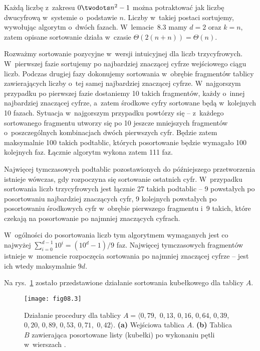 \exercise %
Każdą liczbę z~zakresu $0\twodots n^2-1$ można potraktować jak liczbę dwucyfrową w~systemie o~podstawie $n$. Liczby w~takiej postaci sortujemy, wywołując algorytm  o~dwóch fazach. W~lemacie~8.3 mamy $d=2$ oraz $k=n$, zatem opisane sortowanie działa w~czasie $\Theta(2(n+n))=\Theta(n)$.

\exercise %
Rozważmy sortowanie pozycyjne w~wersji intuicyjnej dla liczb trzycyfrowych. W~pierwszej fazie sortujemy po najbardziej znaczącej cyfrze wejściowego ciągu liczb. Podczas drugiej fazy dokonujemy sortowania w~obrębie fragmentów tablicy zawierających liczby o~tej samej najbardziej znaczącej cyfrze. W~najgorszym przypadku po pierwszej fazie dostaniemy 10 takich fragmentów, każdy o~innej najbardziej znaczącej cyfrze, a~zatem środkowe cyfry sortowane będą w~kolejnych 10 fazach. Sytuacja w~najgorszym przypadku powtórzy się -- z~każdego sortowanego fragmentu utworzy się po 10 jeszcze mniejszych fragmentów o~poszczególnych kombinacjach dwóch pierwszych cyfr. Będzie zatem maksymalnie 100 takich podtablic, których posortowanie będzie wymagało 100 kolejnych faz. Łącznie algorytm wykona zatem 111 faz. 

Najwięcej tymczasowych podtablic pozostawionych do późniejszego przetworzenia istnieje wówczas, gdy rozpoczyna się sortowanie ostatnich cyfr. W~przypadku sortowania liczb trzycyfrowych jest łącznie 27 takich podtablic -- 9 powstałych po posortowaniu najbardziej znaczących cyfr, 9 kolejnych powstałych po posortowaniu środkowych cyfr w~obrębie pierwszego fragmentu i~9 takich, które czekają na posortowanie po najmniej znaczących cyfrach.

W~ogólności do posortowania liczb  tym algorytmem wymaganych jest co najwyżej $\sum_{i=0}^{d-1}10^i=(10^d-1)/9$ faz. Najwięcej tymczasowych fragmentów istnieje w~momencie rozpoczęcia sortowania po najmniej znaczącej cyfrze -- jest ich wtedy maksymalnie $9d$.


\exercise %
Na rys.~\ref{fig:8.4-1} zostało przedstawione działanie sortowania kubełkowego dla tablicy $A$.
\begin{figure}[ht]
	\begin{center}
		\texttt{[image: fig08.3]}
	\end{center}
	\caption{Działanie procedury  dla tablicy $A=\langle0{,}79$,~$0{,}13$, $0{,}16$, $0{,}64$, $0{,}39$, $0{,}20$, $0{,}89$, $0{,}53$,\! $0{,}71$,\!~$0{,}42\rangle$. {\sffamily\bfseries(a)} Wejściowa tablica $A$. {\sffamily\bfseries(b)} Tablica $B$ zawierająca posortowane listy (kubełki) po wykonaniu pętli w~wierszach .} \label{fig:8.4-1}
\end{figure}

